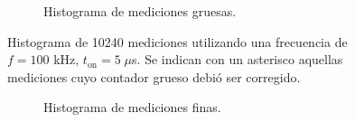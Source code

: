 \begin{figure}[H]
\begin{subfigure}[t]{0.45\textwidth}
{           }
           \caption{Histograma de mediciones gruesas.}
     \end{subfigure}
     \caption{Histograma de 10240 mediciones utilizando una frecuencia de $f=100$ kHz, $t_{\text{on}}=5 \; \mu$s. 
     Se indican con un asterisco aquellas mediciones cuyo contador grueso debió ser corregido.}
\end{figure}

\clearpage

\begin{figure}[H]
     \centering
     \begin{subfigure}[t]{0.45\textwidth} %
           \centering
           \caption{Histograma de mediciones finas.}
           \label{fig: histograma_500}
     \end{subfigure}%
     \hspace{10pt}%
     \begin{subfigure}[t]{0.45\textwidth} %
           \centering
\end{subfigure}
\end{figure}
